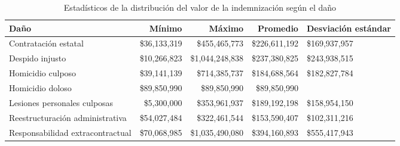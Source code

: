 \begin{table}[htbp]
\centering
\caption{Estadísticos de la distribución del
valor de la indemnización según el daño} 
\label{tab:indemnizacion-dano}
\begin{tabular}{p{3cm}rrrR{2cm}}
  \hline
Daño & Mínimo & Máximo & Promedio & Desviación estándar \\ 
  \hline
Contratación estatal & \$36,133,319 & \$455,465,773 & \$226,611,192 & \$169,937,957 \\ 
  Despido injusto & \$10,266,823 & \$1,044,248,838 & \$237,380,825 & \$243,938,515 \\ 
  Homicidio culposo & \$39,141,139 & \$714,385,737 & \$184,688,564 & \$182,827,784 \\ 
  Homicidio doloso & \$89,850,990 & \$89,850,990 & \$89,850,990 &  \\ 
  Lesiones personales culposas & \$5,300,000 & \$353,961,937 & \$189,192,198 & \$158,954,150 \\ 
  Reestructuración administrativa & \$54,027,484 & \$322,461,544 & \$153,590,407 & \$102,311,216 \\ 
  Responsabilidad extracontractual & \$70,068,985 & \$1,035,490,080 & \$394,160,893 & \$555,417,943 \\ 
   \hline
\end{tabular}
\end{table}
